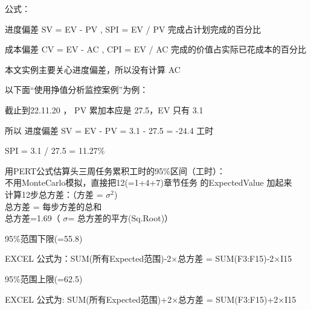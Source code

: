 公式：

\begin{description}
\tightlist
\item[]
进度偏差 SV = EV - PV , SPI = EV / PV 完成占计划完成的百分比
\item[]
成本偏差 CV = EV - AC , CPI = EV / AC 完成的价值占实际已花成本的百分比
\end{description}

本文实例主要关心进度偏差，所以没有计算 AC

以下面“使用挣值分析监控案例”为例：

截止到22.11.20 ， PV 累加本应是 27.5，EV 只有 3.1

\begin{description}
\tightlist
\item[]
所以 进度偏差 SV = EV - PV = 3.1 - 27.5 = -24.4 工时
\item[]
            SPI = 3.1 / 27.5 = 11.27\%
\end{description}


用PERT公式估算头三周任务累积工时的95\%区间（工时）：\\
不用MonteCarlo模拟，直接把12(=1+4+7)章节任务 的ExpectedValue 加起来\\
计算12步总方差：（方差 = \(\sigma^2\))\\
总方差 = 每步方差的总和\\
总方差=1.69（ \(\sigma\)= 总方差的平方(Sq.Root)）

\begin{description}
\item[]
\end{description}

\begin{description}
\tightlist
\item[]
95\%范围下限(=55.8)

\begin{description}
\tightlist
\item[]
EXCEL 公式为：SUM(所有Expected范围)-2×总方差 = SUM(F3:F15)-2×I15
\end{description}

95\%范围上限(=62.5)

\begin{description}
\tightlist
\item[]
EXCEL 公式为: SUM(所有Expected范围)+2×总方差 = SUM(F3:F15)+2×I15
\end{description}
\end{description}

